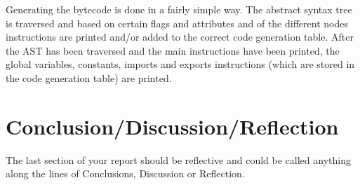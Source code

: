 \documentclass{uva-inf-article}
\begin{document}
\par Generating the bytecode is done in a fairly simple way.
The abstract syntax tree is traversed and based on certain flags and attributes and of the different 
nodes instructions are printed and/or added to the correct code generation table.
After the AST has been traversed and the main instructions have been printed, the global variables, constants, 
imports and exports instructions (which are stored in the code generation table) are printed.

\section{Conclusion/Discussion/Reflection}
\par The last section of your report should be reflective and could be called
anything along the lines of Conclusions, Discussion or Reflection. 




\end{document}
